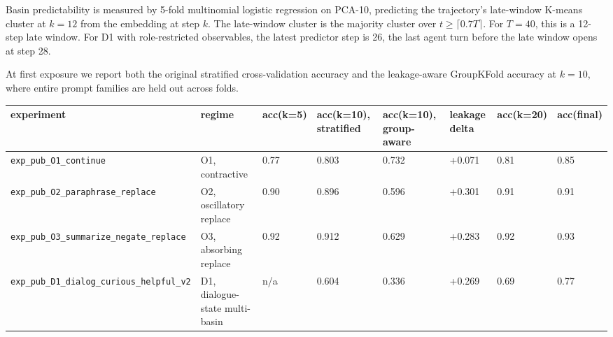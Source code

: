 \documentclass{article}
\theoremstyle{plain}
\theoremstyle{definition}
\begin{document}
Basin predictability is measured by 5-fold multinomial logistic regression on PCA-10, predicting the trajectory's late-window K-means cluster at $k=12$ from the embedding at step $k$. The late-window cluster is the majority cluster over $t \geq \lceil 0.7T \rceil$. For $T = 40$, this is a 12-step late window. For D1 with role-restricted observables, the latest predictor step is 26, the last agent turn before the late window opens at step 28.

At first exposure we report both the original stratified cross-validation accuracy and the leakage-aware GroupKFold accuracy at $k=10$, where entire prompt families are held out across folds.

\begin{table}[h!]
\centering
\small
\begin{tabularx}{\textwidth}{lYYYYYYY}
\toprule
experiment & regime & acc(k=5) & acc(k=10), stratified & acc(k=10), group-aware & leakage delta & acc(k=20) & acc(final) \\
\midrule
\texttt{exp\_pub\_O1\_continue} & O1, contractive & 0.77 & 0.803 & 0.732 & +0.071 & 0.81 & 0.85 \\
\texttt{exp\_pub\_O2\_paraphrase\_replace} & O2, oscillatory replace & 0.90 & 0.896 & 0.596 & +0.301 & 0.91 & 0.91 \\
\texttt{exp\_pub\_O3\_summarize\_negate\_replace} & O3, absorbing replace & 0.92 & 0.912 & 0.629 & +0.283 & 0.92 & 0.93 \\
\texttt{exp\_pub\_D1\_dialog\_curious\_helpful\_v2} & D1, dialogue-state multi-basin & n/a & 0.604 & 0.336 & +0.269 & 0.69 & 0.77 \\
\bottomrule
\end{tabularx}
\end{table}
\end{document}
